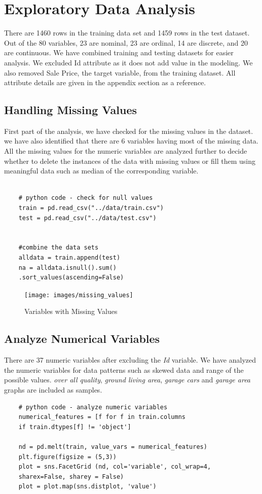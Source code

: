 \documentclass[sigconf]{acmart}
\begin{document}
	\section{Exploratory Data Analysis} 
	
	There are 1460 rows in the training data set and 1459 rows in the test dataset. Out of the 80 variables, 23 are nominal, 23 are ordinal, 14 are discrete, and 20 are continuous. We have combined training and testing datasets for easier analysis. We excluded Id attribute as it does not add value in the modeling. We also removed Sale Price, the target variable, from the training dataset. All attribute details are given in the appendix section as a reference.
	\subsection{Handling Missing Values}
	
	First part of the analysis, we have checked for the missing values in the dataset. we have also identified that there are 6 variables having most of the missing data. All the missing values for the numeric variables are analyzed further to decide whether to delete the instances of the data with missing values or fill them using meaningful data such as median of the corresponding variable.
	
	\begin{verbatim}
	
	# python code - check for null values
	train = pd.read_csv("../data/train.csv")
	test = pd.read_csv("../data/test.csv")
	
	
	#combine the data sets
	alldata = train.append(test)	
	na = alldata.isnull().sum()
	.sort_values(ascending=False)
	\end{verbatim}
	
	\begin{figure}[H]
		\centering
		\texttt{[image: images/missing\_values]}	
		\caption{Variables with Missing Values} \label{fig:missing_values} 
	\end{figure}
	
	\subsection{Analyze Numerical Variables}
	There are 37 numeric variables after excluding the {\em Id} variable. We have analyzed the numeric variables for data patterns such as skewed data and range of the possible values. {\em  over all quality}, {\em ground living area}, {\em garage cars} and {\em garage area} graphs are included as samples.
	\begin{verbatim}
	# python code - analyze numeric variables
	numerical_features = [f for f in train.columns 
	if train.dtypes[f] != 'object']
	
	nd = pd.melt(train, value_vars = numerical_features)	
	plt.figure(figsize = (5,3))
	plot = sns.FacetGrid (nd, col='variable', col_wrap=4,
	sharex=False, sharey = False)
	plot = plot.map(sns.distplot, 'value')				
	\end{verbatim}
	
\end{document}
